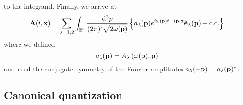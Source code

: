 to the integrand.
Finally, we arrive at
\begin{equation}
	\vb{A}(t,\vb{x})
	=
	\sum_{\lambda=1,2}
	\int_{\mathbb{R}^3}\frac{\dd[3]{p}}{(2\pi)^3\sqrt{2\omega(\vb{p})}}
	\left\{
		a_\lambda(\vb{p})
		e^{i\omega(\vb{p})t-i\vb{p}\vdot\vb{x}}
		\vu{e}_\lambda(\vb{p})
		+
		\text{c.c.}
	\right\}
\end{equation}
where we defined
\begin{equation}
	a_\lambda(\vb{p})
	=
	A_\lambda\left(\omega(\vb{p}),\vb{p}\right)
\end{equation}
and used the conjugate symmetry of the Fourier amplitudes $a_\lambda(-\vb{p})=a_\lambda(\vb{p})^*$.

\subsection{Canonical quantization}